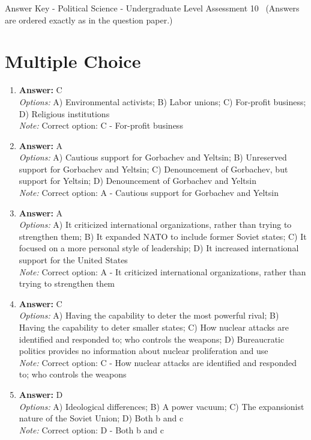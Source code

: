 \documentclass[12pt]{article}
\begin{document}
\begin{center}
Answer Key - Political Science - Undergraduate Level Assessment 10 \
\small (Answers are ordered exactly as in the question paper.)
\end{center}

\section*{Multiple Choice}
\begin{enumerate}[label=\arabic*.]
\item \textbf{Answer:} C
\\ \textit{Options:} A) Environmental activists; B) Labor unions; C) For-profit business; D) Religious institutions
\\ \textit{Note:} Correct option: C - For-profit business
\item \textbf{Answer:} A
\\ \textit{Options:} A) Cautious support for Gorbachev and Yeltsin; B) Unreserved support for Gorbachev and Yeltsin; C) Denouncement of Gorbachev, but support for Yeltsin; D) Denouncement of Gorbachev and Yeltsin
\\ \textit{Note:} Correct option: A - Cautious support for Gorbachev and Yeltsin
\item \textbf{Answer:} A
\\ \textit{Options:} A) It criticized international organizations, rather than trying to strengthen them; B) It expanded NATO to include former Soviet states; C) It focused on a more personal style of leadership; D) It increased international support for the United States
\\ \textit{Note:} Correct option: A - It criticized international organizations, rather than trying to strengthen them
\item \textbf{Answer:} C
\\ \textit{Options:} A) Having the capability to deter the most powerful rival; B) Having the capability to deter smaller states; C) How nuclear attacks are identified and responded to; who controls the weapons; D) Bureaucratic politics provides no information about nuclear proliferation and use
\\ \textit{Note:} Correct option: C - How nuclear attacks are identified and responded to; who controls the weapons
\item \textbf{Answer:} D
\\ \textit{Options:} A) Ideological differences; B) A power vacuum; C) The expansionist nature of the Soviet Union; D) Both b and c
\\ \textit{Note:} Correct option: D - Both b and c
\end{enumerate}
\end{document}
